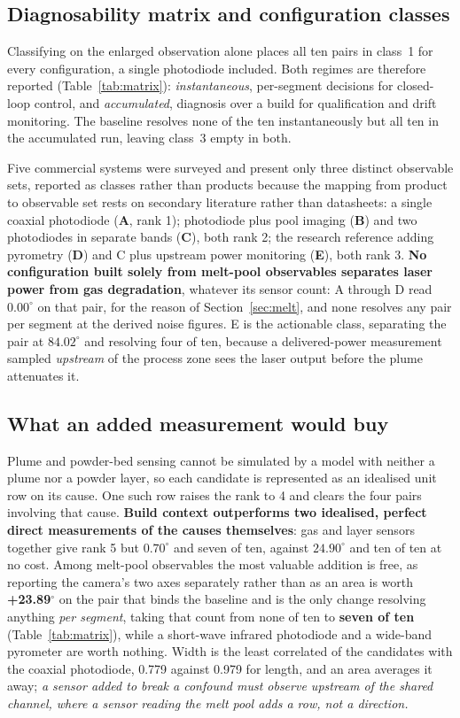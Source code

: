 \documentclass[final,5p,times,twocolumn]{elsarticle}
\begin{document}
\subsection{Diagnosability matrix and configuration classes}

Classifying on the enlarged observation alone places all ten pairs in class~1 for
every configuration, a single photodiode included. Both
regimes are therefore reported (Table~\ref{tab:matrix}): \emph{instantaneous},
per-segment decisions for closed-loop control, and \emph{accumulated}, diagnosis
over a build for qualification and drift monitoring. The baseline resolves none of the ten instantaneously but all ten in the
accumulated run, leaving class~3 empty in both.

Five commercial systems were surveyed and present only three distinct observable
sets, reported as classes rather than products because the mapping from product
to observable set rests on secondary literature rather than datasheets: a single
coaxial photodiode (\textbf{A}, rank 1); photodiode plus pool imaging
(\textbf{B}) and two photodiodes in separate bands (\textbf{C}), both rank 2;
the research reference adding pyrometry (\textbf{D}) and C plus upstream power
monitoring (\textbf{E}), both rank 3. \textbf{No configuration built solely from
melt-pool observables separates laser power from gas degradation}, whatever its
sensor count: A through D read $0.00^\circ$ on that pair, for the reason of
Section~\ref{sec:melt}, and none resolves any pair per segment at the derived
noise figures. E is the actionable class, separating the pair at $84.02^\circ$
and resolving four of ten, because a delivered-power measurement sampled
\emph{upstream} of the process zone sees the laser output before the plume
attenuates it.

\subsection{What an added measurement would buy}
\label{sec:added}

Plume and powder-bed sensing cannot be simulated by a model with neither a plume
nor a powder layer, so each candidate is represented as an idealised unit row on
its cause. One such row raises the rank to 4 and clears the four pairs involving
that cause. \textbf{Build context outperforms two idealised, perfect direct
measurements of the causes themselves}: gas and layer sensors together give rank
5 but $0.70^\circ$ and seven of ten, against $24.90^\circ$ and ten of ten at no
cost. Among melt-pool observables the most valuable addition is free, as
reporting the camera's two axes separately rather than as an area is worth
\textbf{+23.89$^\circ$} on the pair that binds the baseline and is the only
change resolving anything \emph{per segment}, taking that count from none of ten
to \textbf{seven of ten} (Table~\ref{tab:matrix}), while a short-wave infrared
photodiode and a wide-band pyrometer are worth nothing. Width is the least
correlated of the candidates with the coaxial photodiode, 0.779 against 0.979 for
length, and an area averages it away; \emph{a sensor added to break a confound
must observe upstream of the shared channel, where a sensor reading the melt pool
adds a row, not a direction.}
\end{document}
